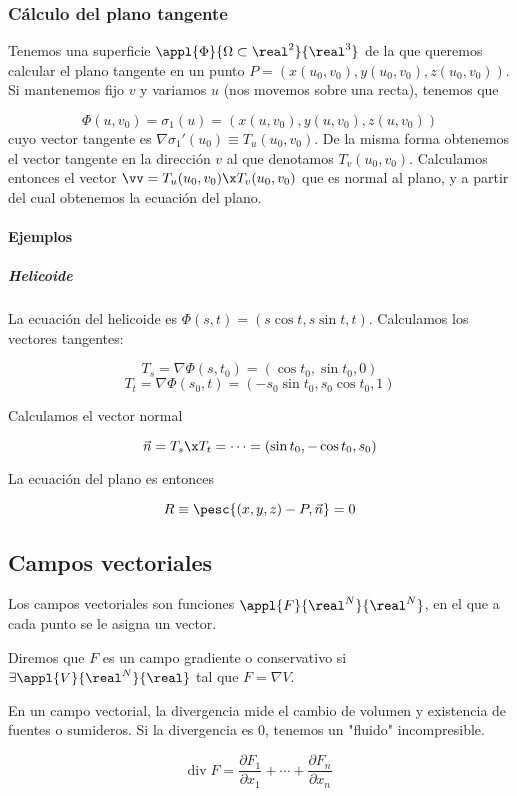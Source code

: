 \documentclass[12pt,a4paper,titlepage]{apuntes}
\begin{document}
\subsubsection{Cálculo del plano tangente}
Tenemos una superficie $\appl{\Phi}{\Omega\subset\real^2}{\real^3}$ de la que queremos calcular el plano tangente en un punto $P = (x(u_0, v_0),y(u_0, v_0),z(u_0, v_0))$. Si mantenemos fijo $v$ y variamos $u$ (nos movemos sobre una recta), tenemos que 

\[ \Phi(u, v_0) = \sigma_1(u) = (x(u, v_0),y(u, v_0),z(u, v_0)) \]
cuyo vector tangente es $\nabla \sigma_1'(u_0) \equiv T_u (u_0, v_0)$. De la misma forma obtenemos el vector tangente en la dirección $v$ al que denotamos $T_v(u_0, v_0)$. Calculamos entonces el vector $\vv = T_u(u_0, v_0)\x T_v(u_0, v_0)$ que es normal al plano, y a partir del cual obtenemos la ecuación del plano.


\paragraph{Ejemplos}
\subparagraph{Helicoide} La ecuación  del helicoide es $\Phi(s,t) = (s\cos t, s\sin t, t)$. Calculamos los vectores tangentes:

\[ T_s = \nabla \Phi(s, t_0) = (\cos t_0, \sin t_0, 0) \]
\[ T_t = \nabla \Phi(s_0, t) = (-s_0\sin t_0, s_0 \cos t_0, 1) \]

Calculamos el vector normal

\[ \vec{n} = T_s \x T_t = \cdots = (\sin t_0, -\cos t_0, s_0) \]

La ecuación del plano es entonces

\[ R\equiv \pesc{(x,y,z) - P, \vec{n}} = 0 \]

\subsection{Campos vectoriales}
Los campos vectoriales son funciones $\appl{F}{\real^N}{\real^N}$, en el que a cada punto se le asigna un vector.

\begin{defn}
Diremos que $F$ es un campo gradiente o conservativo si $\exists \appl{V}{\real^N}{\real}$ tal que $F=\nabla V$.
\end{defn}

\begin{defn}[Divergencia]
En un campo vectorial, la divergencia mide el cambio de volumen y existencia de fuentes o sumideros. Si la divergencia es 0, tenemos un "fluido" incompresible.

\[ \textrm{div}\;F = \frac{∂F_1}{∂x_1} + \cdots + \frac{∂F_n}{∂x_n} \]
\end{defn}
\end{document}
